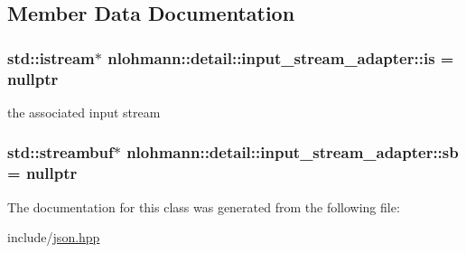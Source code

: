 \subsection{Member Data Documentation}
\subsubsection[{\texorpdfstring{is}{is}}]{\setlength{\rightskip}{0pt plus 5cm}std\+::istream$\ast$ nlohmann\+::detail\+::input\+\_\+stream\+\_\+adapter\+::is = nullptr\hspace{0.3cm}{\ttfamily [private]}}\hypertarget{classnlohmann_1_1detail_1_1input__stream__adapter_a55893bf84cb17d877464984942df9632}{}\label{classnlohmann_1_1detail_1_1input__stream__adapter_a55893bf84cb17d877464984942df9632}


the associated input stream 

\subsubsection[{\texorpdfstring{sb}{sb}}]{\setlength{\rightskip}{0pt plus 5cm}std\+::streambuf$\ast$ nlohmann\+::detail\+::input\+\_\+stream\+\_\+adapter\+::sb = nullptr\hspace{0.3cm}{\ttfamily [private]}}\hypertarget{classnlohmann_1_1detail_1_1input__stream__adapter_aa94582dc8262cf35dfcfbe7b7fcd6c6c}{}\label{classnlohmann_1_1detail_1_1input__stream__adapter_aa94582dc8262cf35dfcfbe7b7fcd6c6c}


The documentation for this class was generated from the following file\+:\begin{DoxyCompactItemize}
\item 
include/\hyperlink{json_8hpp}{json.\+hpp}\end{DoxyCompactItemize}
